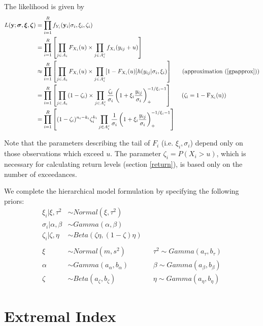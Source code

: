 \documentclass[12pt]{article}
\newcommand{\m}[1]{\mathbf{\bm{#1}}}
\newcommand{\m}[1]{\mathbf{\bm{#1}}}
\begin{document}
The likelihood is given by
\begin{align}
L(\m{y}; \m{\sigma}, \m{\xi}, \m{\zeta}) &= \prod_{i=1}^R f_{Y_i}(\m{y}_i|\sigma_i,\xi_i,\zeta_i) \nonumber \\
&= \prod_{i=1}^R\left[\prod_{j\in A_i} F_{X_i}(u) \times \prod_{j\in A_i^c} f_{X_i}(y_{ij}+u)\right] \nonumber \\
&\approx \prod_{i=1}^R\left[\prod_{j\in A_i} F_{X_i}(u) \times \prod_{j\in A_i^c} [1-F_{X_i}(u)]h(y_{ij}|\sigma_i,\xi_i)\right]~~~~~\mathrm{(approximation~(\ref{gpapprox}))} \nonumber \\
&= \prod_{i=1}^R\left[\prod_{j\in A_i} (1-\zeta_i)\times \prod_{j\in A_i^c} \frac{\zeta_i}{\sigma_i}\left(1+\xi_i\frac{y_{ij}}{\sigma_i}\right)_+^{-1/\xi_i-1}\right]~~~~~\mathrm{(\zeta_i=1-F_{X_i}(u))} \nonumber \\
&= \prod_{i=1}^R\left[(1-\zeta_i)^{n_i-k_i}\zeta_i^{k_i}\prod_{j\in A_i^c}\frac{1}{\sigma_i}\left(1+\xi_i\frac{y_{ij}}{\sigma_i}\right)_+^{-1/\xi_i-1}\right] \label{biglike}
\end{align}

Note that the parameters describing the tail of $F_i$ (i.e. $\xi_i,\sigma_i$) depend only on those observations which exceed $u$. The parameter $\zeta_i=P(X_i>u)$, which is necessary for calculating return levels (section \ref{return}), is based only on the number of exceedances.

We complete the hierarchical model formulation by specifying the following priors:
\begin{align}
\xi_i|\xi, \tau^2  &\sim Normal(\xi, \tau^2) \nonumber \\
\sigma_i|\alpha, \beta &\sim Gamma(\alpha, \beta) \nonumber \\
\zeta_i|\zeta, \eta &\sim Beta(\zeta\eta, (1-\zeta)\eta) \nonumber \\
 \label{priors} \\
\xi &\sim Normal(m, s^2)&  &\tau^2 \sim Gamma(a_\tau, b_\tau) \nonumber \\
\alpha &\sim Gamma(a_\alpha, b_\alpha)&  &\beta \sim Gamma(a_\beta, b_\beta) \nonumber \\
\zeta &\sim Beta(a_\zeta, b_\zeta)&  &\eta \sim Gamma(a_\eta, b_\eta) \nonumber
\end{align}

\section{Extremal Index}
\label{index}
\end{document}
